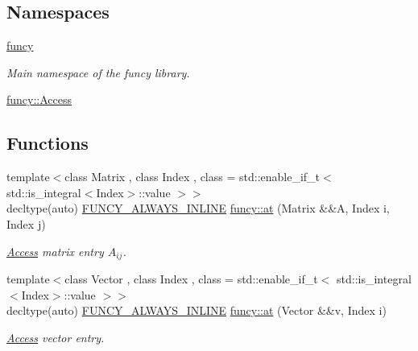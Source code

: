 \subsection*{Namespaces}
\begin{DoxyCompactItemize}
\item 
\hyperlink{namespacefuncy}{funcy}
\begin{DoxyCompactList}\small\item\em Main namespace of the funcy library. \end{DoxyCompactList}\item 
\hyperlink{namespacefuncy_1_1Access}{funcy\-::\-Access}
\end{DoxyCompactItemize}
\subsection*{Functions}
\begin{DoxyCompactItemize}
\item 
{\footnotesize template$<$class Matrix , class Index , class  = std\-::enable\-\_\-if\-\_\-t$<$ std\-::is\-\_\-integral$<$\-Index$>$\-::value $>$$>$ }\\decltype(auto) \hyperlink{macros_8hh_aeb0da27a25e923327d595a79f556281d}{F\-U\-N\-C\-Y\-\_\-\-A\-L\-W\-A\-Y\-S\-\_\-\-I\-N\-L\-I\-N\-E} \hyperlink{namespacefuncy_a1a543c0f61343fa69a250819fd87069a}{funcy\-::at} (Matrix \&\&A, Index i, Index j)
\begin{DoxyCompactList}\small\item\em \hyperlink{namespacefuncy_1_1Access}{Access} matrix entry $A_{ij}$. \end{DoxyCompactList}\item 
{\footnotesize template$<$class Vector , class Index , class  = std\-::enable\-\_\-if\-\_\-t$<$ std\-::is\-\_\-integral$<$\-Index$>$\-::value $>$$>$ }\\decltype(auto) \hyperlink{macros_8hh_aeb0da27a25e923327d595a79f556281d}{F\-U\-N\-C\-Y\-\_\-\-A\-L\-W\-A\-Y\-S\-\_\-\-I\-N\-L\-I\-N\-E} \hyperlink{namespacefuncy_a2e348eb0fe3b971cdf77bdcf8201c7fe}{funcy\-::at} (Vector \&\&v, Index i)
\begin{DoxyCompactList}\small\item\em \hyperlink{namespacefuncy_1_1Access}{Access} vector entry. \end{DoxyCompactList}\end{DoxyCompactItemize}
